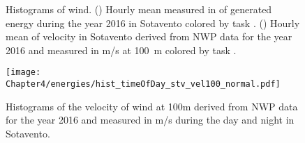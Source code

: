  \begin{figure}[t!]
   \centering
\caption{\label{fig:wind_task_def_tday} Histograms of wind. (\protect{}) {Hourly mean measured} %
 in \si{\kilo{\watt\hour}} of generated energy during the year 2016 in Sotavento colored by {task} . (\protect{}) Hourly mean of velocity in Sotavento derived from NWP data for the year 2016 and measured in m/s at \SI{100}{\metre} colored by {task} .}
\end{figure}

\begin{figure}[t!]
   \centering
   \texttt{[image: Chapter4/energies/hist\_timeOfDay\_stv\_vel100\_normal.pdf]}
 \caption{\label{fig:stv_vel100} Histograms of the velocity of wind at 100m derived from NWP data for the year 2016 and measured in m/s during the day and night in Sotavento.
}
\end{figure}

